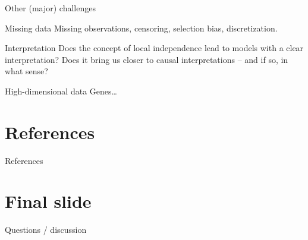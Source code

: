 \documentclass{beamer}\usepackage{listings}
\begin{document}
\begin{frame}[label={sec:org60900a0}]{Other (major) challenges}
\begin{block}{Missing data}
Missing observations, censoring, selection bias, discretization.
\end{block}

\begin{block}{Interpretation}
Does the concept of local independence lead to models with a clear interpretation? Does it bring us
closer to causal interpretations -- and if so, in what sense?
\end{block}

\begin{block}{High-dimensional data}
Genes\ldots{} 
\end{block}
\end{frame}

\section{References}
\label{sec:orgad36848}
\begin{frame}[label={sec:org3c36440}]{References}
\tiny 
\end{frame}

\section{Final slide}
\label{sec:org0ca9517}
\begin{frame}[label={sec:org9761500}]{Questions / discussion}
\end{frame}
\end{document}
